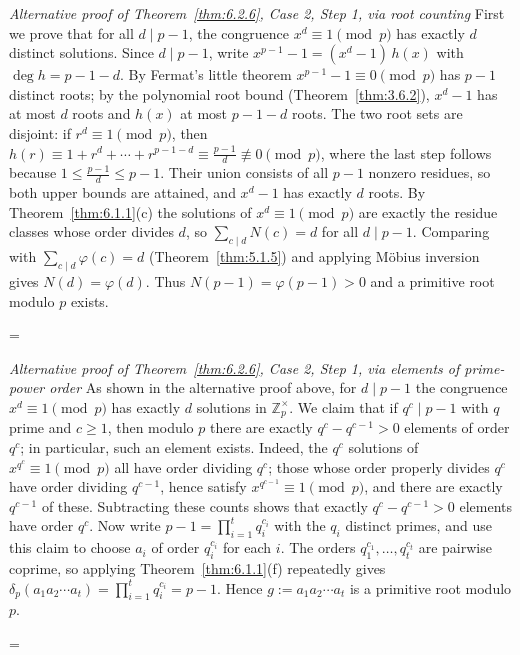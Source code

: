 \documentclass[11pt]{article}
\makeatletter
\theoremstyle{ntstyle}
\let\nt@closedisplay\]
\def\nt@guardedclose{\@ifnextchar\par{\nt@closeafterpar}{\@ifnextchar\end{\postdisplaypenalty\@M\nt@closedisplay}{\nt@closedisplay}}}
\def\nt@closeafterpar\par{\@ifnextchar\par{\nt@closeafterpar}{\@ifnextchar\end{\postdisplaypenalty\@M\nt@closedisplay\par}{\nt@closedisplay\par}}}
\renewenvironment{proof}[1][\proofname]{\par
  \pushQED{\qed}\normalfont\topsep\medskipamount\edef\nt@afterproof{\@endparpenalty=\the\@endparpenalty\relax}\@beginparpenalty\@M\@endparpenalty\@M\let\]\nt@guardedclose\trivlist\item[]\textit{#1\@addpunct{.}} \ignorespaces}{\ifvmode\addpenalty\@M\fi\popQED\nt@afterproof\endtrivlist\@endpefalse}
\newenvironment{altproof}[1][\proofname]{\begin{proof}[#1]\renewcommand{\qedsymbol}{}}{\end{proof}}
\newcommand{\ZmodUnits}[1]{\mathbb{Z}_{#1}^{\times}}
\makeatother
\begin{document}
\begin{altproof}[Alternative proof of Theorem~\ref{thm:6.2.6}, Case 2, Step 1, via root counting] First we prove that for all $d \mid p-1$, the congruence $x^{d}
		\equiv 1 \pmod{p}$ has exactly $d$ distinct solutions. Since $d \mid
		p-1$, write $x^{p-1} - 1 = (x^{d} - 1)\,h(x)$ with $\deg h = p - 1 -
		d$. By Fermat's little theorem $x^{p-1} - 1 \equiv 0 \pmod{p}$ has
	$p-1$ distinct roots; by the polynomial root bound
	(Theorem~\ref{thm:3.6.2}), $x^{d} - 1$ has at most $d$ roots
	and $h(x)$ at most $p-1-d$ roots.
	  The two root sets are disjoint: if $r^{d}\equiv1\pmod{p}$, then $h(r)\equiv1+r^{d}+\cdots+r^{p-1-d}\equiv\frac{p-1}{d}\not\equiv0\pmod{p}$, where the last step follows because $1\le\frac{p-1}{d}\le p-1$.
	  Their union consists of all $p-1$ nonzero residues, so both upper bounds are attained, and $x^d-1$ has exactly $d$ roots.
	  By Theorem~\ref{thm:6.1.1}(c) the solutions of $x^{d}\equiv1\pmod{p}$ are exactly the residue classes whose order divides $d$, so $\sum_{c \mid d} N(c) = d$
	for all $d \mid p-1$. Comparing with $\sum_{c \mid d} \varphi(c) = d$ (Theorem~\ref{thm:5.1.5})
	and applying M{\"o}bius inversion gives $N(d) = \varphi(d)$. Thus
	$N(p-1) = \varphi(p-1) > 0$ and a primitive root modulo $p$ exists.

\end{altproof}
\begin{altproof}[Alternative proof of Theorem~\ref{thm:6.2.6}, Case 2, Step 1, via elements of prime-power order]
	As shown in the alternative proof above, for $d \mid p-1$ the congruence $x^{d}
		\equiv 1 \pmod{p}$ has exactly $d$ solutions in
	$\ZmodUnits{p}$. We claim that if $q^{c} \mid p-1$ with $q$ prime
	and $c \ge 1$, then modulo $p$ there are exactly $q^{c} - q^{c-1} >
		0$ elements of order $q^{c}$; in particular, such an element exists.
	Indeed, the $q^{c}$ solutions of $x^{q^{c}} \equiv 1 \pmod{p}$ all
	have order dividing $q^{c}$; those whose order properly divides
	$q^{c}$ have order dividing $q^{c-1}$, hence satisfy $x^{q^{c-1}}
		\equiv 1 \pmod{p}$, and there are exactly $q^{c-1}$ of these.
	Subtracting these counts shows that exactly $q^{c} - q^{c-1} > 0$ elements have order
	$q^{c}$. Now write $p-1 = \prod_{i=1}^{t} q_i^{c_i}$ with the $q_i$
	distinct primes, and use this claim to choose $a_i$ of order
	$q_i^{c_i}$ for each $i$. The orders $q_1^{c_1}, \ldots, q_t^{c_t}$
	are pairwise coprime, so applying Theorem~\ref{thm:6.1.1}(f) repeatedly gives
	$\delta_p(a_1 a_2 \cdots a_t) = \prod_{i=1}^{t} q_i^{c_i} = p-1$.
	Hence $g := a_1 a_2 \cdots a_t$ is a primitive root modulo $p$.

\end{altproof}
\end{document}
